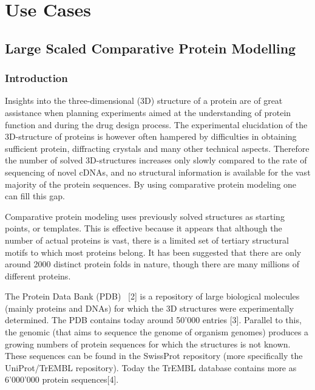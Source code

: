 \documentclass[a4paper,10pt]{article}
\begin{document}
\section{Use Cases}
\subsection{Large Scaled Comparative Protein Modelling}
\subsubsection{Introduction}
Insights into the three-dimensional (3D) structure of a protein are of great assistance when planning experiments aimed at the understanding of protein function and during the drug design process. The experimental elucidation of the 3D-structure of proteins is however often hampered by difficulties in obtaining sufficient protein, diffracting crystals and many other technical aspects. Therefore the number of solved 3D-structures increases only slowly compared to the rate of sequencing of novel cDNAs, and no structural information is available for the vast majority of the protein sequences. By using comparative protein modeling one can fill this gap.

Comparative protein modeling uses previously solved structures as starting points, or templates. This is effective because it appears that although the number of actual proteins is vast, there is a limited set of tertiary structural motifs to which most proteins belong. It has been suggested that there are only around 2000 distinct protein folds in nature, though there are many millions of different proteins.

The Protein Data Bank (PDB)  [2] is a repository of large biological molecules (mainly proteins and DNAs) for which the 3D structures were experimentally determined. The PDB contains today around 50'000 entries [3]. Parallel to this, the genomic (that aims to sequence the genome of organism genomes) produces a growing numbers of protein sequences for which the structures is not known. These sequences can be found in the
SwissProt repository (more specifically the UniProt/TrEMBL repository). Today the TrEMBL database contains more as 6'000'000 protein sequences[4].
\end{document}

